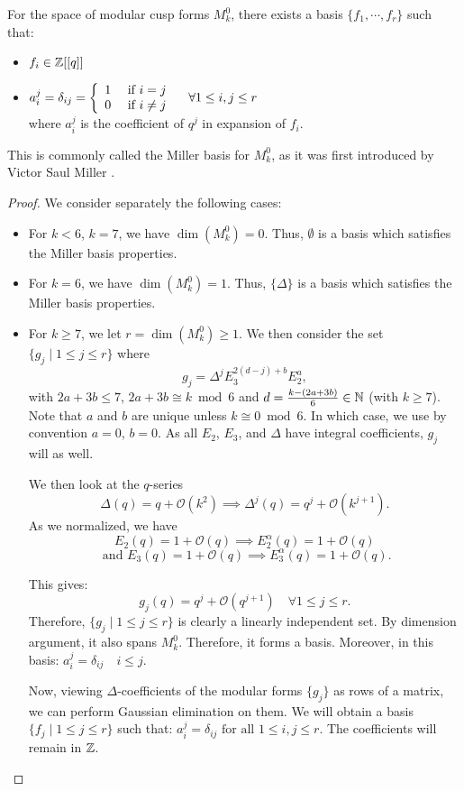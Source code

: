 \begin{theorem}
	For the space of modular cusp forms $M_k^0$, there exists a basis $\{f_1, \cdots, f_r\}$ such that:
	\begin{itemize}
		\item $f_i \in \mathbb{Z}[[q]]$
		\item $ a_i^j = \delta_{ij} = 
		\left\lbrace
		\begin{array}{l l}
			1 & \text{ if } i   =  j \\
			0 & \text{ if } i \neq j
		\end{array}
		\right. \quad
		\forall 1 \leq i,j \leq r$\\
		where $a_i^j$ is the coefficient of $q^j$ in expansion of $f_i$.
	\end{itemize}
\end{theorem}
This is commonly called the Miller basis for $M_k^0$, as it was first introduced by Victor Saul Miller \cite{MillerThesis}.
\begin{proof}
	We consider separately the following cases:
	\begin{itemize}
		\item For $k<6$, $k=7$, we have $\dim(M_k^0)=0$.
		Thus, $\emptyset$ is a basis which satisfies the Miller basis properties.
		
		\item For $k=6$, we have $\dim(M_k^0)=1$.
		Thus, $\{ \Delta \}$ is a basis which satisfies the Miller basis properties.
		
		\item For $k \geq 7$, we let $r = \dim(M_k^0) \geq 1$.	
		We then consider the set $\{ g_j \mid 1 \leq j \leq r \}$ where
		$$
		g_j = \Delta^jE_3^{2(d-j)+b}E_2^a,
		$$
		with $2a+3b \leq 7$, $2a+3b \cong k \bmod 6$ and $d = \frac{k-(2a+3b)}{6} \in \mathbb{N}$ (with $k \geq 7$).
		Note that $a$ and $b$ are unique unless $k \cong 0 \bmod 6$. In which case, we use by convention $a=0$, $b=0$.
		As all $E_2$, $E_3$, and $\Delta$ have integral coefficients, $g_j$ will as well.
		
		We then look at the $q$-series
		$$
		\Delta(q) = q + \mathcal{O}(k^2) \implies \Delta^j(q) = q^j + \mathcal{O}(k^{j+1}).
		$$
		As we normalized, we have
		$$
		E_2(q) = 1 + \mathcal{O}(q) \implies E_2^{\alpha}(q) = 1 + \mathcal{O}(q)
		$$
		$$
		\text{ and } E_3(q) = 1 + \mathcal{O}(q) \implies E_3^{\alpha}(q) = 1 + \mathcal{O}(q).
		$$
		
		This gives:
		$$
		g_j(q) = q^j + \mathcal{O}(q^{j+1}) \quad \forall 1 \leq j \leq r.
		$$
		Therefore, $\{ g_j \mid 1 \leq j \leq r \}$ is clearly a linearly independent set. By dimension argument, it also spans $M_k^0$. Therefore, it forms a basis.
		Moreover, in this basis: $a_i^j = \delta_{ij} \quad i \leq j$.
		
		Now, viewing $\Delta$-coefficients of the modular forms $\{g_j\}$ as rows of a matrix, we can perform Gaussian elimination on them.
		We will obtain a basis $\{f_j \mid 1 \leq j \leq r \}$ such that: $a_i^j = \delta_{ij} \text{ for all } 1 \leq i,j \leq r$.
		The coefficients will remain in $\mathbb{Z}$.
	\end{itemize}
\end{proof}

